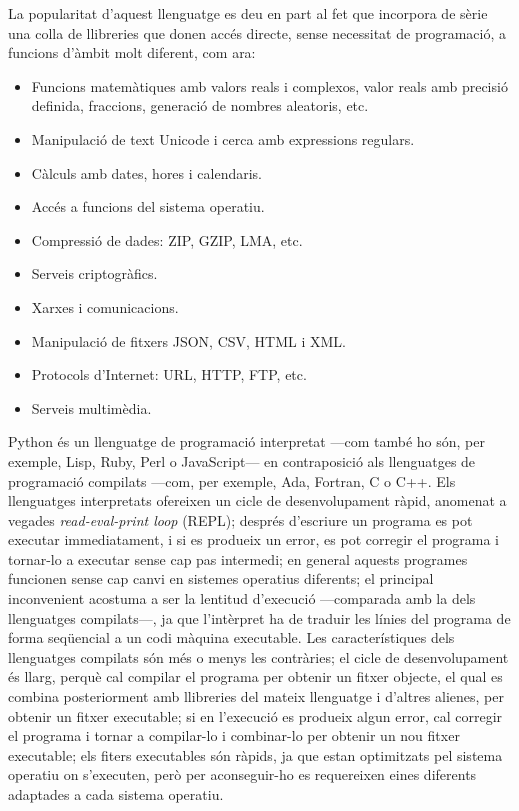 La popularitat d'aquest llenguatge es deu en part al fet que incorpora de sèrie una colla de llibreries que donen accés directe, sense necessitat de programació, a funcions d'àmbit molt diferent, com ara:
\begin{itemize}
	\item  Funcions matemàtiques amb valors reals i complexos, valor reals amb precisió definida, fraccions, generació de nombres aleatoris, etc.
	\item Manipulació de text Unicode i cerca amb expressions regulars.
	\item Càlculs amb dates, hores i calendaris.
	\item Accés a funcions del sistema operatiu.
	\item Compressió de dades: ZIP, GZIP, LMA, etc.
	\item Serveis criptogràfics.
	\item Xarxes i comunicacions.
	\item Manipulació de fitxers JSON, CSV, HTML i XML.
	\item Protocols d'Internet: URL, HTTP, FTP, etc.
	\item Serveis multimèdia.
\end{itemize}


Python és un llenguatge de programació interpretat ---com també ho són, per exemple,  Lisp, Ruby, Perl o JavaScript--- en contraposició als llenguatges de programació compilats ---com, per exemple, Ada, Fortran, C o C++. Els llenguatges interpretats ofereixen un cicle de desenvolupament ràpid, anomenat a vegades  \textit{read-eval-print loop} (REPL); després d'escriure un programa es pot executar immediatament, i si es produeix  un error, es pot corregir el programa i tornar-lo a executar sense cap pas intermedi; en general aquests programes funcionen sense cap canvi en  sistemes operatius diferents; el principal inconvenient acostuma a ser la lentitud d'execució ---comparada amb la dels llenguatges compilats---, ja que l'intèrpret ha de traduir les línies del programa de forma seqüencial a un codi màquina executable. Les característiques dels llenguatges compilats són més o menys les contràries; el cicle de desenvolupament és llarg, perquè cal compilar el programa per obtenir un fitxer objecte, el qual es combina posteriorment amb llibreries del mateix llenguatge i d'altres alienes, per obtenir un fitxer executable; si en l'execució es produeix algun error, cal corregir el programa i tornar a compilar-lo i combinar-lo per obtenir un nou fitxer executable; els fiters executables són ràpids, ja que estan optimitzats pel sistema operatiu on s'executen, però per aconseguir-ho  es requereixen eines diferents adaptades a cada sistema operatiu.

